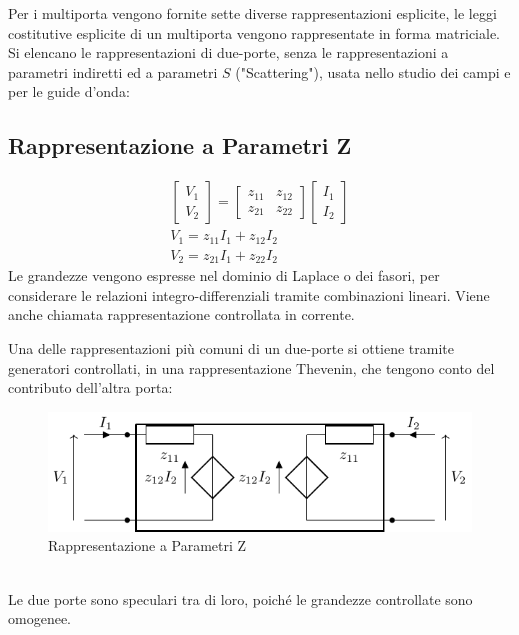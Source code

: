 \documentclass{article}
\numberwithin{equation}{subsection}
\begin{document}
Per i multiporta vengono fornite sette diverse rappresentazioni esplicite, le leggi costitutive esplicite di un multiporta vengono rappresentate in forma matriciale. Si elencano 
le rappresentazioni di due-porte, senza le rappresentazioni a parametri indiretti ed a parametri $S$ ("Scattering"), usata nello studio dei campi e per le guide d'onda:

\subsection{Rappresentazione a Parametri Z}

\begin{gather*}
    \begin{bmatrix}
        V_1\\V_2
    \end{bmatrix}=\begin{bmatrix}
        z_{11}&z_{12}\\z_{21}&z_{22}
    \end{bmatrix}\begin{bmatrix}
        I_1\\I_2
    \end{bmatrix}\\
    V_1=z_{11}I_1+z_{12}I_2\\
    V_2=z_{21}I_1+z_{22}I_2
\end{gather*}
Le grandezze vengono espresse nel dominio di Laplace o dei fasori, per considerare le relazioni integro-differenziali tramite combinazioni lineari. Viene anche chiamata 
rappresentazione controllata in corrente. 

Una delle rappresentazioni più comuni di un due-porte si ottiene tramite generatori controllati, in una rappresentazione Thevenin, che tengono conto del contributo dell'altra 
porta:
\begin{figure}[ht]%
    \centering
    \includegraphics{rappresentazione-parametri-z.pdf}
    \caption{Rappresentazione a Parametri Z}
    \label{fig:rappresentazione-parametri-z}
\end{figure}
\\
Le due porte sono speculari tra di loro, poiché le grandezze controllate sono omogenee. 
\end{document}

